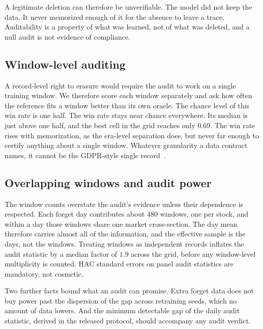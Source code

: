 A legitimate deletion can therefore be unverifiable. The model did
not keep the data. It never memorized enough of it for the absence
to leave a trace. Auditability is a property of what was learned,
not of what was deleted, and a null audit is not evidence of
compliance.

\subsection{Window-level auditing}

A record-level right to erasure would require the audit to work on
a single training window. We therefore score each window separately
and ask how often the reference fits a window better than its own
oracle. The chance level of this win rate is one half. The win rate
stays near chance everywhere. Its median is just above one half,
and the best cell in the grid reaches only $0.69$. The win rate
rises with memorization, as the era-level separation does, but
never far enough to certify anything about a single window.
Whatever granularity a data contract names, it cannot be the
GDPR-style single record~\cite{gdpr2016}.

\subsection{Overlapping windows and audit power}

The window counts overstate the audit's evidence unless their
dependence is respected. Each forget day contributes about 480
windows, one per stock, and within a day those windows share one
market cross-section. The day mean therefore carries almost all of
the information, and the effective sample is the days, not the
windows. Treating windows as independent records inflates the audit
statistic by a median factor of $1.9$ across the grid, before any
window-level multiplicity is counted. HAC standard errors on panel
audit statistics are mandatory, not cosmetic.

Two further facts bound what an audit can promise. Extra forget
data does not buy power past the dispersion of the gap across
retraining seeds, which no amount of data lowers. And the minimum
detectable gap of the daily audit statistic, derived in the
released protocol, should accompany any audit verdict.

